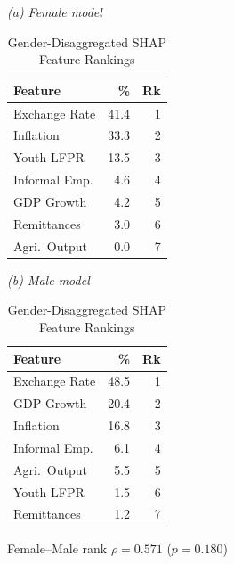 \begin{table}[htbp]
\caption{Gender-Disaggregated SHAP Feature Rankings}
\label{tab:gender_shap}
\centering
\footnotesize
\begin{minipage}[t]{0.47\columnwidth}
\centering
\textit{(a) Female model}\\[2pt]
\begin{tabular}{@{}lrr@{}}
\toprule
\textbf{Feature} & \textbf{\%} & \textbf{Rk}\\
\midrule
Exchange Rate & 41.4 & 1\\
Inflation     & 33.3 & 2\\
Youth LFPR    & 13.5 & 3\\
Informal Emp. &  4.6 & 4\\
GDP Growth    &  4.2 & 5\\
Remittances   &  3.0 & 6\\
Agri.\ Output &  0.0 & 7\\
\bottomrule
\end{tabular}
\end{minipage}
\hfill
\begin{minipage}[t]{0.47\columnwidth}
\centering
\textit{(b) Male model}\\[2pt]
\begin{tabular}{@{}lrr@{}}
\toprule
\textbf{Feature} & \textbf{\%} & \textbf{Rk}\\
\midrule
Exchange Rate & 48.5 & 1\\
GDP Growth    & 20.4 & 2\\
Inflation     & 16.8 & 3\\
Informal Emp. &  6.1 & 4\\
Agri.\ Output &  5.5 & 5\\
Youth LFPR    &  1.5 & 6\\
Remittances   &  1.2 & 7\\
\bottomrule
\end{tabular}
\end{minipage}
\par\smallskip
\scriptsize Female--Male rank $\rho = 0.571$ ($p = 0.180$)
\end{table}
